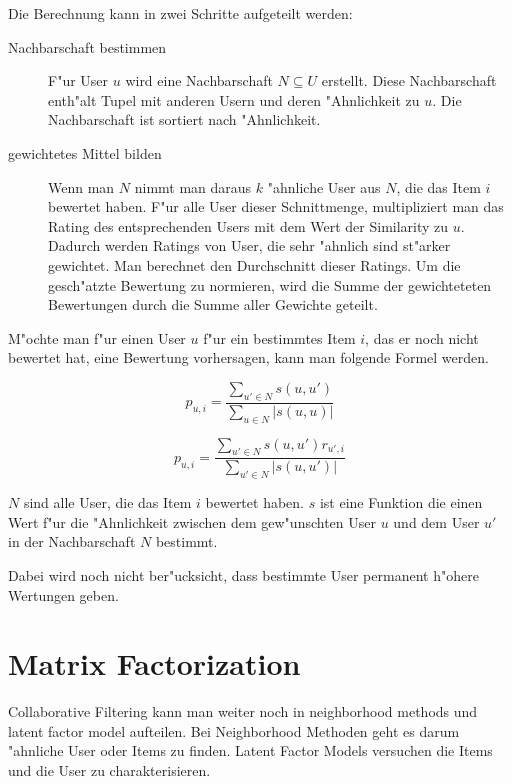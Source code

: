 \documentclass[a4paper, 11pt]{article}
\begin{document}
Die Berechnung kann in zwei Schritte aufgeteilt werden:
\begin{description}
\item[Nachbarschaft bestimmen] F"ur User $u$ wird eine Nachbarschaft $N \subseteq U$ erstellt. Diese Nachbarschaft enth"alt Tupel mit anderen Usern und deren "Ahnlichkeit zu $u$. Die Nachbarschaft ist sortiert nach "Ahnlichkeit.
\item [gewichtetes Mittel bilden] Wenn man $N$ nimmt man daraus $k$ "ahnliche User aus $N$, die das Item $i$ bewertet haben. F"ur alle User dieser Schnittmenge, multipliziert man das Rating des entsprechenden Users mit dem Wert der Similarity zu $u$. Dadurch werden Ratings von User, die sehr "ahnlich sind st"arker gewichtet. Man berechnet den Durchschnitt dieser Ratings. Um die gesch"atzte Bewertung zu normieren, wird die Summe der gewichteteten Bewertungen durch die Summe aller Gewichte geteilt.
\end{description}

M"ochte man f"ur einen User $u$ f"ur ein bestimmtes Item $i$, das er noch nicht bewertet hat, eine Bewertung vorhersagen, kann man folgende Formel werden.

\begin{equation}
  p_{u,i} = \frac{\sum_{u' \in N}s(u,u')}{\sum_{u \in N}|s(u,u)|}
\end{equation}

\begin{equation}
  \label{eq:computeprediction}
  p_{u,i} = \frac{\sum_{u' \in N}{s(u,u') r_{u',i}}}{\sum_{u' \in N}{|s(u,u')|}}
\end{equation}

$N$ sind alle User, die das Item $i$ bewertet haben. $s$ ist eine Funktion die einen Wert f"ur die "Ahnlichkeit zwischen dem gew"unschten User $u$ und dem User $u'$ in der Nachbarschaft $N$ bestimmt.

Dabei wird noch nicht ber"ucksicht, dass bestimmte User permanent h"ohere Wertungen geben.

\section{Matrix Factorization}
\label{sec:matrixfactorization}

Collaborative Filtering kann man weiter noch in neighborhood methods und latent factor model aufteilen. Bei Neighborhood Methoden geht es darum "ahnliche User oder Items zu finden. Latent Factor Models versuchen die Items und die User zu charakterisieren. 
\end{document}
